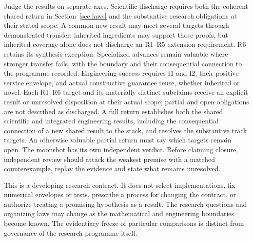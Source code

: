 \documentclass[11pt]{article}
\begin{document}
Judge the results on separate axes. Scientific discharge requires both the coherent shared return in Section~\ref{sec:laws} and the substantive research obligations at their stated scope. A common new result may meet several targets through demonstrated transfer; inherited ingredients may support those proofs, but inherited coverage alone does not discharge an R1--R5 extension requirement. R6 retains its synthesis exception. Specialized advances remain valuable where stronger transfer fails, with the boundary and their consequential connection to the programme recorded. Engineering success requires I1 and I2, their positive service envelope, and actual constructive guarantee reuse, whether inherited or novel. Each R1--R6 target and its materially distinct subclaims receive an explicit result or unresolved disposition at their actual scope; partial and open obligations are not described as discharged. A full return establishes both the shared scientific and integrated engineering results, including the consequential connection of a new shared result to the stack, and resolves the substantive track targets. An otherwise valuable partial return must say which targets remain open. The moonshot has its own independent verdict. Before claiming closure, independent review should attack the weakest premise with a matched counterexample, replay the evidence and state what remains unresolved.

This is a developing research contract. It does not select implementations, fix numerical envelopes or tests, prescribe a process for changing the contract, or authorize treating a promising hypothesis as a result. The research questions and organizing laws may change as the mathematical and engineering boundaries become known. The evidentiary freeze of particular comparisons is distinct from governance of the research programme itself.

\appendix
\end{document}
